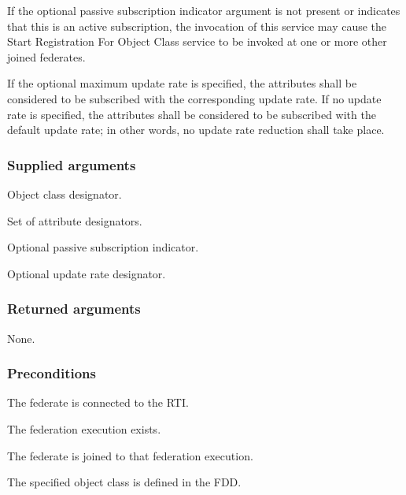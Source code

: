 \begin{compactstdpage}
    If the optional passive subscription indicator argument is not present or indicates that this is an active subscription, the invocation of this service may cause the Start Registration For Object Class service to be invoked at one or more other joined federates.

    If the optional maximum update rate is specified, the attributes shall be considered to be subscribed with the corresponding update rate. If no update rate is specified, the attributes shall be considered to be subscribed with the default update rate; in other words, no update rate reduction shall take place.

    \subsubsection{Supplied arguments}
    \begin{stdalphalist}
        \item Object class designator.
        \item Set of attribute designators.
        \item Optional passive subscription indicator.
        \item Optional update rate designator.
    \end{stdalphalist}

    \subsubsection{Returned arguments}
    \begin{stdalphalist}
        \item None.
    \end{stdalphalist}

    \subsubsection{Preconditions}
    \begin{stdalphalist}
        \item The federate is connected to the RTI.
        \item The federation execution exists.
        \item The federate is joined to that federation execution.
        \item The specified object class is defined in the FDD.
    \end{stdalphalist}
\end{compactstdpage}

